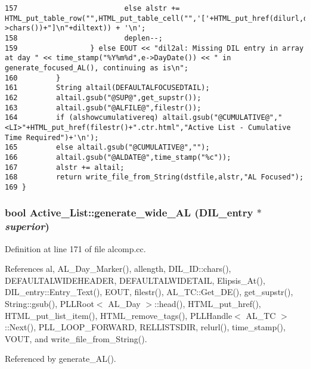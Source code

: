 \begin{verbatim}
157                         else alstr += HTML_put_table_row("",HTML_put_table_cell("",'['+HTML_put_href(dilurl,de->chars())+"]\n"+diltext)) + '\n';
158                         deplen--;
159                 } else EOUT << "dil2al: Missing DIL entry in array at day " << time_stamp("%Y%m%d",e->DayDate()) << " in generate_focused_AL(), continuing as is\n";
160         }
161         String altail(DEFAULTALFOCUSEDTAIL);
162         altail.gsub("@SUP@",get_supstr());
163         altail.gsub("@ALFILE@",filestr());
164         if (alshowcumulativereq) altail.gsub("@CUMULATIVE@","<LI>"+HTML_put_href(filestr()+".ctr.html","Active List - Cumulative Time Required")+'\n');
165         else altail.gsub("@CUMULATIVE@","");
166         altail.gsub("@ALDATE@",time_stamp("%c"));
167         alstr += altail;
168         return write_file_from_String(dstfile,alstr,"AL Focused");
169 }
\end{verbatim}\normalsize 
{}
\subsubsection{\setlength{\rightskip}{0pt plus 5cm}bool Active\_\-List::generate\_\-wide\_\-AL ({\bf DIL\_\-entry} $\ast$ {\em superior})}\label{classActive__List_a17}




Definition at line 171 of file alcomp.cc.

References al, AL\_\-Day\_\-Marker(), allength, DIL\_\-ID::chars(), DEFAULTALWIDEHEADER, DEFAULTALWIDETAIL, Elipsis\_\-At(), DIL\_\-entry::Entry\_\-Text(), EOUT, filestr(), AL\_\-TC::Get\_\-DE(), get\_\-supstr(), String::gsub(), PLLRoot$<$ AL\_\-Day $>$::head(), HTML\_\-put\_\-href(), HTML\_\-put\_\-list\_\-item(), HTML\_\-remove\_\-tags(), PLLHandle$<$ AL\_\-TC $>$::Next(), PLL\_\-LOOP\_\-FORWARD, RELLISTSDIR, relurl(), time\_\-stamp(), VOUT, and write\_\-file\_\-from\_\-String().

Referenced by generate\_\-AL().



